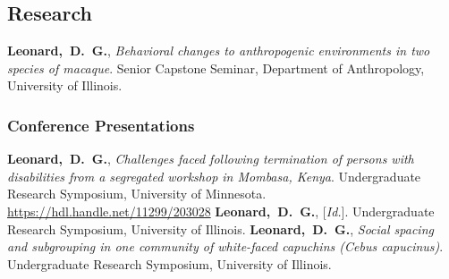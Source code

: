 	
\subsection{Research}
	{{\textbf{Leonard,~D.~G.}}, {\textit{Behavioral changes to anthropogenic environments in two species of macaque}}. Senior Capstone Seminar, Department of Anthropology, University of Illinois.}

\subsubsection{Conference Presentations}
	{{\textbf{Leonard,~D.~G.}}, {\textit{Challenges faced following termination of persons with disabilities from a segregated workshop in Mombasa, Kenya}}. Undergraduate Research Symposium, University of Minnesota. \url{https://hdl.handle.net/11299/203028}}
	{{\textbf{Leonard,~D.~G.}}, [{\textit{Id.}}]. Undergraduate Research Symposium, University of Illinois.}
	{{\textbf{Leonard,~D.~G.}}, {\textit{Social spacing and subgrouping in one community of white-faced capuchins (\emph{Cebus capucinus})}}. Undergraduate Research Symposium, University of Illinois.}

\iffalse
\section{Awards and Grants}
\secitemgrant
	{2019}
	{175}
	{Travel Grant}
	{University of Illinois Department of Undergraduate Research}
	{}
	{University of Minnesota Undergraduate Research Symposium}
	{}
\fi


